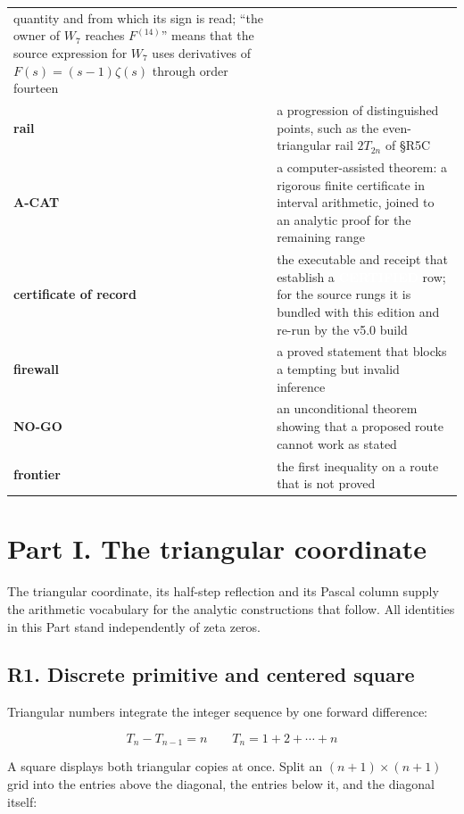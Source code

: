 \documentclass[
  11pt,
]{book}
\newcommand{\tnstatusbox}[2]{%
  {\setlength{\fboxsep}{2.1pt}%
   \colorbox{#1}{\textcolor{white}{\scriptsize\bfseries\hspace{0.5pt}#2\hspace{0.5pt}}}}}
\newcommand{\CERT}{\tnstatusbox{tnblue}{CERTIFIED}}
\begin{document}
\begin{longtable}[]{@{}
  >{\raggedright\arraybackslash}p{}
  >{\raggedright\arraybackslash}p{}@{}}
quantity and from which its sign is read; ``the owner of \(W_7\) reaches
\(F^{(14)}\)'' means that the source expression for \(W_7\) uses
derivatives of \(F(s)=(s-1)\zeta(s)\) through order fourteen \\
\textbf{rail} & a progression of distinguished points, such as the
even-triangular rail \(2T_{2n}\) of §R5C \\
\textbf{A-CAT} & a computer-assisted theorem: a rigorous finite
certificate in interval arithmetic, joined to an analytic proof for the
remaining range \\
\textbf{certificate of record} & the executable and receipt that
establish a \CERT{} row; for the source rungs it is bundled with this
edition and re-run by the v5.0 build \\
\textbf{firewall} & a proved statement that blocks a tempting but
invalid inference \\
\textbf{NO-GO} & an unconditional theorem showing that a proposed route
cannot work as stated \\
\textbf{frontier} & the first inequality on a route that is not
proved \\
\end{longtable}


\chapter{Part I. The triangular
coordinate}\label{part-i.-the-triangular-coordinate}

The triangular coordinate, its half-step reflection and its Pascal
column supply the arithmetic vocabulary for the analytic constructions
that follow. All identities in this Part stand independently of zeta
zeros.

\section{R1. Discrete primitive and centered
square}\label{r1.-discrete-primitive-and-centered-square}

Triangular numbers integrate the integer sequence by one forward
difference:

\[
T_n-T_{n-1}=n
\qquad
T_n=1+2+\cdots+n
\tag{1.1}
\]

A square displays both triangular copies at once. Split an
\((n+1)\times(n+1)\) grid into the entries above the diagonal, the
entries below it, and the diagonal itself:
\end{document}
